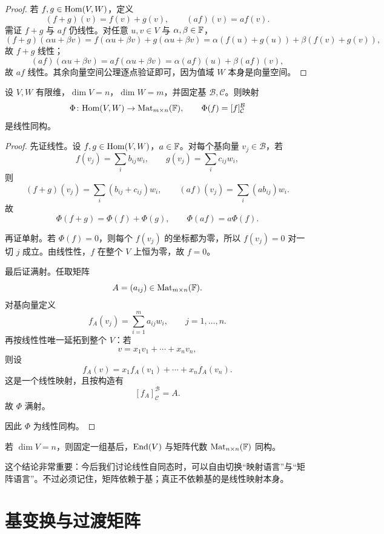 \begin{proof}
若 $f,g\in\mathrm{Hom}(V,W)$，定义
\[
  (f+g)(v)=f(v)+g(v),\qquad (af)(v)=a f(v).
\]
需证 $f+g$ 与 $af$ 仍线性。对任意 $u,v\in V$ 与 $\alpha,\beta\in\mathbb{F}$，
\[
  (f+g)(\alpha u+\beta v)
  =f(\alpha u+\beta v)+g(\alpha u+\beta v)
  =\alpha(f(u)+g(u))+\beta(f(v)+g(v)),
\]
故 $f+g$ 线性；
\[
  (af)(\alpha u+\beta v)=a f(\alpha u+\beta v)=\alpha(af)(u)+\beta(af)(v),
\]
故 $af$ 线性。其余向量空间公理逐点验证即可，因为值域 $W$ 本身是向量空间。
\end{proof}

\begin{theorem}
设 $V,W$ 有限维，$\dim V=n$，$\dim W=m$，并固定基 $\mathcal B,\mathcal C$。则映射
\[
  \Phi\colon \mathrm{Hom}(V,W)\to \mathrm{Mat}_{m\times n}(\mathbb{F}),
  \qquad
  \Phi(f)=[f]_{\mathcal C}^{\mathcal B}
\]
是线性同构。
\end{theorem}

\begin{proof}
先证线性。设 $f,g\in\mathrm{Hom}(V,W)$，$a\in\mathbb{F}$。对每个基向量 $v_j\in\mathcal B$，若
\[
  f(v_j)=\sum_i b_{ij}w_i,
  \qquad
  g(v_j)=\sum_i c_{ij}w_i,
\]
则
\[
  (f+g)(v_j)=\sum_i (b_{ij}+c_{ij})w_i,
  \qquad
  (af)(v_j)=\sum_i (ab_{ij})w_i.
\]
故
\[
  \Phi(f+g)=\Phi(f)+\Phi(g),
  \qquad
  \Phi(af)=a\Phi(f).
\]

再证单射。若 $\Phi(f)=0$，则每个 $f(v_j)$ 的坐标都为零，所以 $f(v_j)=0$ 对一切 $j$ 成立。由线性性，$f$ 在整个 $V$ 上恒为零，故 $f=0$。

最后证满射。任取矩阵
\[
  A=(a_{ij})\in\mathrm{Mat}_{m\times n}(\mathbb{F}).
\]
对基向量定义
\[
  f_A(v_j)=\sum_{i=1}^m a_{ij}w_i,
  \qquad j=1,\dots,n.
\]
再按线性性唯一延拓到整个 $V$：若
\[
  v=x_1v_1+\cdots+x_nv_n,
\]
则设
\[
  f_A(v)=x_1f_A(v_1)+\cdots+x_nf_A(v_n).
\]
这是一个线性映射，且按构造有
\[
  [f_A]_{\mathcal C}^{\mathcal B}=A.
\]
故 $\Phi$ 满射。

因此 $\Phi$ 为线性同构。
\end{proof}

\begin{corollary}
若 $\dim V=n$，则固定一组基后，$\mathrm{End}(V)$ 与矩阵代数 $\mathrm{Mat}_{n\times n}(\mathbb{F})$ 同构。
\end{corollary}

\begin{remark}
这个结论非常重要：今后我们讨论线性自同态时，可以自由切换“映射语言”与“矩阵语言”。不过必须记住，矩阵依赖于基；真正不依赖基的是线性映射本身。
\end{remark}

\section{基变换与过渡矩阵}

